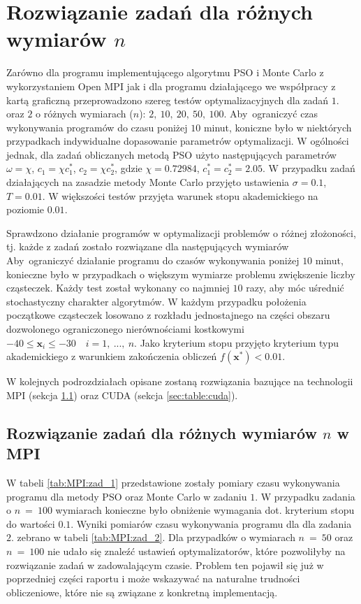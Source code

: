 \documentclass[11pt, a4paper, oneside]{article}
\newcommand{\vect}[1]{\bm{\mathbf{#1}}}
\begin{document}
\section{Rozwiązanie zadań dla różnych wymiarów $n$}

Zarówno dla programu implementującego algorytmu PSO i Monte Carlo z wykorzystaniem Open MPI jak i dla programu działającego we współpracy z kartą graficzną przeprowadzono szereg testów optymalizacyjnych dla zadań $1$. oraz $2$ o różnych wymiarach ($n$): $2, \ 10, \ 20, \ 50, \ 100$. Aby~ograniczyć czas wykonywania programów do czasu poniżej $10$ minut, koniczne było w niektórych przypadkach indywidualne dopasowanie parametrów optymalizacji. W ogólności jednak, dla zadań obliczanych metodą PSO użyto następujących parametrów $\omega = \chi$, $c_1 = \chi c_1^*$, $c_2 = \chi c_2^*$, gdzie $\chi = 0.72984$, $c_1^* = c_2^* = 2.05$. W przypadku zadań działających na zasadzie metody Monte Carlo przyjęto ustawienia $\sigma = 0.1$, $T = 0.01$. W większości testów przyjęta warunek stopu akademickiego na poziomie $0.01$.

Sprawdzono działanie programów w optymalizacji problemów o różnej złożoności, tj. każde z zadań zostało rozwiązane dla następujących wymiarów  Aby~ograniczyć działanie programu do czasów wykonywania poniżej $10$ minut, konieczne było w przypadkach o większym wymiarze problemu zwiększenie liczby cząsteczek. Każdy test został wykonany co najmniej $10$ razy, aby móc uśrednić stochastyczny charakter algorytmów. W każdym przypadku położenia początkowe cząsteczek losowano z rozkładu jednostajnego na części obszaru dozwolonego ograniczonego nierównościami kostkowymi $-40 \leq \vect{x}_i \leq -30 \quad i = 1, \ ..., \ n$. Jako kryterium stopu przyjęto kryterium typu akademickiego z warunkiem zakończenia obliczeń $f\left(\vect{x}^{*}\right) < 0.01$.

W kolejnych podrozdziałach opisane zostaną rozwiązania bazujące na technologii MPI (sekcja \ref{sec:table:mpi}) oraz CUDA (sekcja \ref{sec:table:cuda}).

\subsection{Rozwiązanie zadań dla różnych wymiarów $n$ w MPI} \label{sec:table:mpi}

W tabeli \ref{tab:MPI:zad_1} przedstawione zostały pomiary czasu wykonywania programu dla metody PSO oraz Monte Carlo w zadaniu $1$. W przypadku zadania o $n \ = \ 100$ wymiarach konieczne było obniżenie wymagania dot. kryterium stopu do wartości $0.1$. Wyniki pomiarów czasu wykonywania programu dla dla zadania $2$. zebrano w tabeli  \ref{tab:MPI:zad_2}. Dla przypadków o wymiarach $n \ = \ 50$ oraz $n \ = \ 100$ nie udało się znaleźć ustawień optymalizatorów, które pozwoliłyby na rozwiązanie zadań w zadowalającym czasie. Problem ten pojawił się już w poprzedniej części raportu i może wskazywać na naturalne trudności obliczeniowe, które nie są związane z konkretną implementacją.
\end{document}
